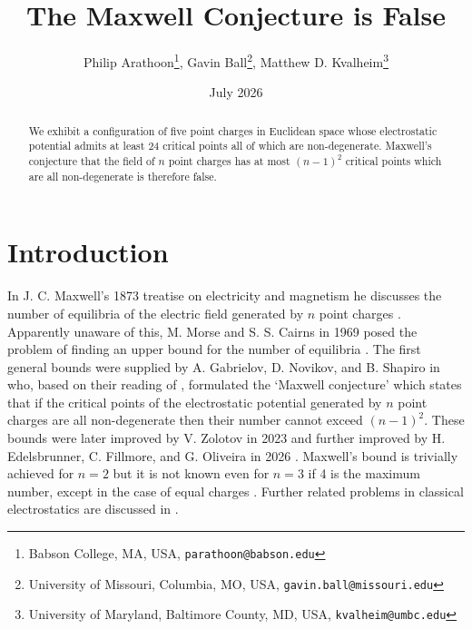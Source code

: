 \documentclass[12pt,a4paper]{article}
\title{The Maxwell Conjecture is False }
\author{Philip Arathoon\thanks{Babson College, MA, USA, \texttt{parathoon@babson.edu}}, Gavin Ball\thanks{University of Missouri, Columbia, MO, USA, \texttt{gavin.ball@missouri.edu}}, Matthew D. Kvalheim\thanks{University of Maryland, Baltimore County, MD, USA, \texttt{kvalheim@umbc.edu}}}
\date{July 2026}
\theoremstyle{plain}
\theoremstyle{definition}
\begin{document}
	\maketitle
	\begin{abstract}
		
		We exhibit a configuration of five point charges in Euclidean space whose electrostatic potential admits at least 24 critical points all of which are non-degenerate. Maxwell's conjecture that the field of \(n\) point charges has at most \((n-1)^2\) critical points which are all non-degenerate is therefore false.
	\end{abstract}
	
				
	
	\section{Introduction}
	
	In J. C. Maxwell's 1873 treatise on electricity and magnetism he discusses the number of equilibria of the electric field generated by \(n\) point charges \cite[\S113]{maxwell1873treastise}. Apparently unaware of this, M. Morse and S. S. Cairns in 1969 posed the problem of finding an upper bound for the number of equilibria \cite[p.~293]{morse1969critical}. The first general bounds were supplied by A. Gabrielov, D. Novikov, and B. Shapiro in \cite{gabrielov2007mystery} who, based on their reading of \cite[\S113]{maxwell1873treastise}, formulated the `Maxwell conjecture' which states that if the critical points of the electrostatic potential generated by \(n\) point charges are all non-degenerate then their number cannot exceed \((n-1)^2\). These bounds were later improved by V. Zolotov in 2023 \cite{zolotov2023} and further improved by H. Edelsbrunner, C. Fillmore, and G. Oliveira in 2026 \cite{edelsbruner2026counting}. 
	Maxwell's bound is trivially achieved for \(n=2\) but it is not known even for \(n=3\) if 4 is the maximum number, except in the case of equal charges \cite{tsai2015maxwell}. 
	Further related problems in classical electrostatics are discussed in \cite{abanov2021around}. 
	
\end{document}
